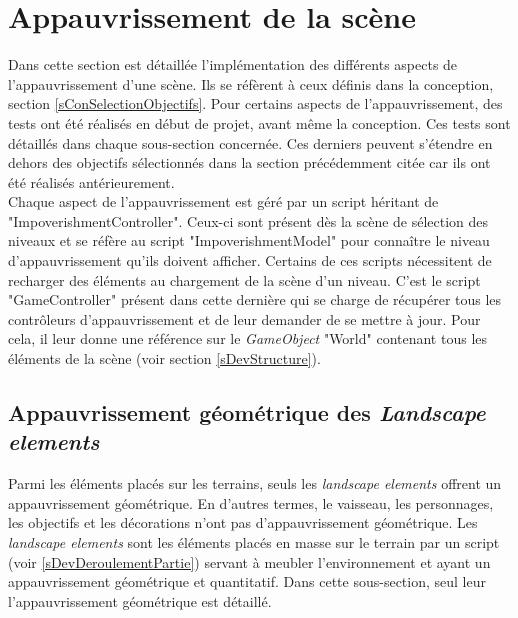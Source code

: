 \section{Appauvrissement de la scène}
	\label{sDevAppauvrissement}
	Dans cette section est détaillée l'implémentation des différents aspects de l'appauvrissement d'une scène. Ils se réfèrent à ceux définis dans la conception, section \ref{sConSelectionObjectifs}. Pour certains aspects de l'appauvrissement, des tests ont été réalisés en début de projet, avant même la conception. Ces tests sont détaillés dans chaque sous-section concernée. Ces derniers peuvent s'étendre en dehors des objectifs sélectionnés dans la section précédemment citée car ils ont été réalisés antérieurement.
	\\
	
	Chaque aspect de l'appauvrissement est géré par un script héritant de "ImpoverishmentController". Ceux-ci sont présent dès la scène de sélection des niveaux et se réfère au script "ImpoverishmentModel" pour connaître le niveau d'appauvrissement qu'ils doivent afficher. Certains de ces scripts nécessitent de recharger des éléments au chargement de la scène d'un niveau. C'est le script "GameController" présent dans cette dernière qui se charge de récupérer tous les contrôleurs d'appauvrissement et de leur demander de se mettre à jour. Pour cela, il leur donne une référence sur le \textit{GameObject} "World" contenant tous les éléments de la scène (voir section \ref{sDevStructure}).
	
	\subsection*{Appauvrissement géométrique des \textit{Landscape elements}}
		
		Parmi les éléments placés sur les terrains, seuls les \textit{landscape elements} offrent un appauvrissement géométrique. En d'autres termes, le vaisseau, les personnages, les objectifs et les décorations n'ont pas d'appauvrissement géométrique.
		Les \textit{landscape elements} sont les éléments placés en masse sur le terrain par un script (voir \ref{sDevDeroulementPartie}) servant à meubler l'environnement et ayant un appauvrissement géométrique et quantitatif. Dans cette sous-section, seul leur l'appauvrissement géométrique est détaillé.
		\\
	
